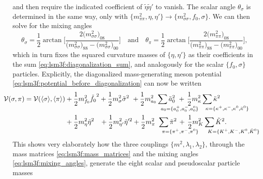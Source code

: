 and then require the indicated coefficient of $\tilde{\eta} \tilde{\eta}'$ to vanish.
The scalar angle $\theta_\sigma$ is determined in the same way, only with
$\{m^2_{\pi\pi}, \eta, \eta'\} \rightarrow \{m^2_{\sigma\sigma}, f_0, \sigma\}$.
We can then solve for the mixing angles
\begin{equation}
	\theta_\sigma = \frac12 \arctan \Bigg[ \frac{2\big(m^2_{\sigma\sigma}\big)_{08}}{\big(m^2_{\sigma\sigma}\big)_{88} - \big(m^2_{\sigma\sigma}\big)_{00}} \Bigg]
	\quad \text{and} \quad
	\theta_\pi = \frac12 \arctan \Bigg[ \frac{2\big(m^2_{\pi\pi}\big)_{08}}{\big(m^2_{\pi\pi}\big)_{88} - \big(m^2_{\pi\pi}\big)_{00}} \Bigg],
\label{eq:lsm3f:mixing_angles}
\end{equation}
which in turn fixes the squared curvature masses of $\{\eta,\eta'\}$ as their coefficients in the sum \eqref{eq:lsm3f:diagonalization_sum},
and analogously for the scalar $\{f_0,\sigma\}$ particles.
Explicitly, the diagonalized mass-generating meson potential \eqref{eq:lsm3f:potential_before_diagonalization} can now be written
\begin{equation}
\begin{split}
	\hspace{-2cm} \pot(\sigma,\pi) = \pot(\avg{\sigma},\avg{\pi}) &+ \frac12 m^2_{f_0} \tilde{f_0}^2  + \frac12 m^2_{\sigma} \tilde{\sigma}^2 \,\, + \frac12 m^2_{a_0} \sum_{\mathrlap{\!\!a_0 = \{a_0^+,a_0^-,a_0^0\}}} \tilde{a}_0^2               \,\, + \, \frac12 m^2_{\kappa} \sum_{\mathrlap{\!\!\kappa = \{\kappa^+,\kappa^-,\kappa^0,\bar{\kappa}^0\}}} \tilde{\kappa}^2 \\
	                                                              &+ \frac12 m^2_{\eta} \tilde{\eta}^2 \,\,\,\,\, + \frac12 m^2_{\eta'} \tilde{\eta}'^2 + \frac12 m^2_{\pi_{\phantom{0}}} \sum_{\mathrlap{\!\!\pi = \{\pi^+,\pi^-,\pi^0\}}} \tilde{\pi}^2 \, + \, \frac12 m^2_{K} \sum_{\mathrlap{\!\!K = \{K^+,K^-,K^0,\bar{K}^0\}}} \tilde{K}^2. \\
\end{split}
\label{eq:lsm3f:potential_after_diagonalization}
\end{equation}
This shows very elaborately how the three couplings $\{m^2, \lambda_1, \lambda_2\}$,
through the mass matrices \eqref{eq:lsm3f:mass_matrices} and the mixing angles \eqref{eq:lsm3f:mixing_angles},
generate the eight scalar and pseudoscalar particle masses
